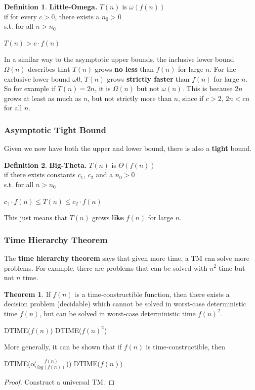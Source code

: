 \documentclass{article}
\theoremstyle{definition}
\newtheorem{definition}{Definition}[section]
\newtheorem{theorem}{Theorem}[section]
\begin{document}
\begin{definition}{\textbf{Little-Omega.}}
$T(n)$ is $\omega(f(n))$ \\
if for every $c > 0$, there exists a $n_{0} > 0$ \\
s.t. for all $n > n_{0}$
\begin{center}
$T(n) > c \cdot f(n)$
\end{center}
\end{definition}
\noindent
In a similar way to the asymptotic upper bounds, the inclusive lower bound $\Omega(n)$ describes that $T(n)$ grows \textbf{no less} than $f(n)$ for large $n$. For the exclusive lower bound $\omega0$, $T(n)$ grows \textbf{strictly faster} than $f(n)$ for large $n$. So for example if $T(n) = 2n$, it is $\Omega(n)$ but not $\omega(n)$. This is because $2n$ grows at least as much as $n$, but not strictly more than $n$, since if $c > 2$, $2n < cn$ for all $n$. 

\subsubsection{Asymptotic Tight Bound}
Given we now have both the upper and lower bound, there is also a \textbf{tight} bound. 
\begin{definition}{\textbf{Big-Theta.}}
$T(n)$ is $\Theta(f(n))$ \\
if there exists constants $c_{1}$, $c_{2}$ and a $n_{0} > 0$ \\
s.t. for all $n > n_{0}$
\begin{center}
$c_{1} \cdot f(n) \leq T(n) \leq c_{2} \cdot f(n)$
\end{center}
\end{definition}
\noindent
This just means that $T(n)$ grows \textbf{like} $f(n)$ for large $n$.

\subsubsection{Time Hierarchy Theorem}
The \textbf{time hierarchy theorem} says that given more time, a TM can solve more problems. For example, there are problems that can be solved with $n^2$ time but not $n$ time.
\begin{theorem}
If $f(n)$ is a time-constructible function, then there exists a decision problem (decidable) which cannot be solved in worst-case deterministic time $f(n)$, but can be solved in worst-case deterministic time $f(n)^2$.
\begin{center}
\textsc{DTIME}($f(n)$) \not\subseteq \textsc{DTIME}($f(n)^2$)
\end{center}
More generally, it can be shown that if $f(n)$ is time-constructible, then
\begin{center}
\textsc{DTIME}(o($\frac{f(n)}{log(f(n))}$)) \not\subseteq \textsc{DTIME}($f(n)$)
\end{center}
\end{theorem}
\begin{proof}
Construct a universal TM. 
\end{proof}
\end{document}
